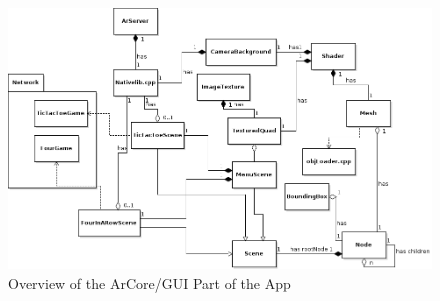 \begin{figure}
  \includegraphics[width=\textwidth]{UML/ArCoreUML.png}
  \caption{Overview of the ArCore/GUI Part of the App}
\end{figure}
